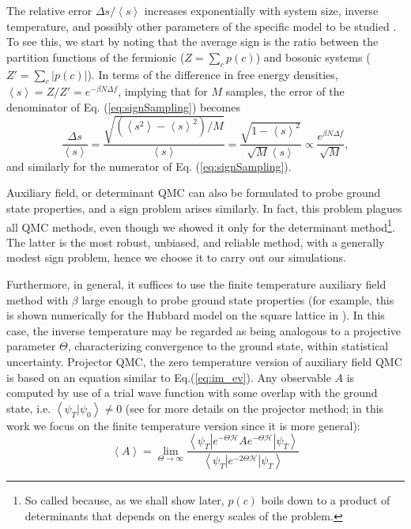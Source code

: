 The relative error $\Delta s / \left\langle s \right\rangle$ increases exponentially with system size, inverse temperature, and possibly other parameters of the specific model to be studied \cite{troyer_computational_2005, hou_numerical_2009}.
To see this, we start by noting that the average sign is the ratio between the partition functions of the fermionic ($Z = \sum_c p(c)$) and bosonic systems ($Z' = \sum_c | p ( c ) |$).
In terms of the difference in free energy densities, $\left\langle s \right\rangle = Z / Z' = e^{-\beta N \Delta f}$, implying that for $M$ samples, the error of the denominator of Eq. (\ref{eq:signSampling}) becomes
\begin{equation}
\frac{\Delta s}{\left\langle s \right\rangle} = \frac{\sqrt{(\left\langle s^2 \right\rangle - \left\langle s \right\rangle^2 )/ M }}{\left\langle s \right\rangle} = \frac{ \sqrt{ 1 - \left\langle s \right\rangle^2}  }{\sqrt{M} \left\langle s \right\rangle} \propto \frac{e^{\beta N \Delta f}}{\sqrt{M}} ,
\end{equation}
and similarly for the numerator of Eq. (\ref{eq:signSampling}).

Auxiliary field, or determinant \acs{QMC} can also be formulated to probe ground state properties, and a sign problem arises similarly.
In fact, this problem plagues all \acs{QMC} methods, even though we showed it only for the determinant method\footnote{So called because, as we shall show later, $p (c)$ boils down to a product of determinants that depends on the energy scales of the problem.}.
The latter is the most robust, unbiased, and reliable method, with a generally modest sign problem, hence we choose it to carry out our simulations.

Furthermore, in general, it suffices to use the finite temperature auxiliary field  method with $\beta$ large enough to probe ground state properties (for example, this is shown numerically for the Hubbard model on the square lattice in \cite{white_numerical_1989}).
In this case, the inverse temperature may be regarded as being analogous to a  projective parameter $\Theta$, characterizing convergence to the ground state, within statistical uncertainty.
Projector \ac{QMC}, the zero temperature version of auxiliary field \ac{QMC} is based on an equation similar to Eq.(\ref{eq:im_ev}).
Any observable $A$ is computed by use of a trial wave function with some overlap with the ground state, i.e. $\left\langle \psi_T | \psi_0 \right\rangle \neq 0$ (see \cite{f._assaad_quantum_2002} for more details on the projector method; in this work we focus on the finite temperature version since it is more general):
\begin{equation}
\left\langle A \right\rangle = \lim_{\Theta \rightarrow \infty} \frac{\left\langle \psi_T | e^{-\Theta \mathcal{H} } A e^{-\Theta \mathcal{H} } | \psi_T \right\rangle }{\left\langle \psi_T | e^{- 2 \Theta \mathcal{H} } | \psi_T \right\rangle}
\end{equation}

